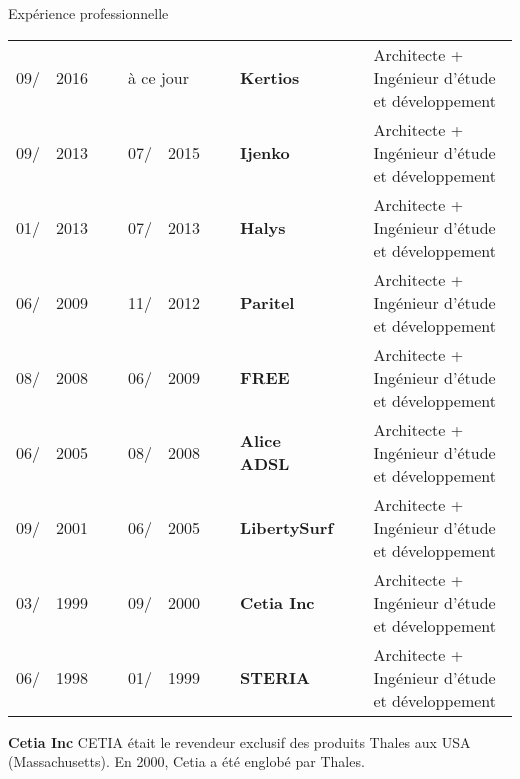 \documentclass{cv}
\newlength{\vlengthSectionTitleContent}
\newcommand{\mainSectionSeparator}[1]{%
   \vspace{10pt}\par%
   \begin{tcolorbox}[notitle,
                     nobeforeafter, %
                     boxrule=0pt,
                     top=1pt,
                     bottom=1pt,
                     halign=center,
                     valign=center,
                     width=\textwidth,
                     colback={colorMainSection}]%
      #1%
   \end{tcolorbox}%
   \par%
}%
\newenvironment{sectionComponent}{%
   \vspace{\vlengthSectionTitleContent}\par%
}{%
   \par%
}%
\newenvironment{packed_tabular}{
   \setlength{\tabcolsep}{0pt}
}{}
\newcommand{\cpname}[1]{%
  \textbf{#1}%
}
\begin{document}

   \newpage
   \mainSectionSeparator{Expérience professionnelle}

   \begin{sectionComponent}
      \begin{packed_tabular}
         \begin{tabular}{lclclclll}
            09/ & 2016 & ~ & \multicolumn{2}{l}{à ce jour} & ~ & \cpname{Kertios}     & ~ &%
                Architecte + Ingénieur d'étude et développement \\
            09/ & 2013 & ~ & 07/ & 2015                    & ~ & \cpname{Ijenko}      & ~ &%
                Architecte + Ingénieur d'étude et développement \\
            01/ & 2013 & ~ & 07/ & 2013                    & ~ & \cpname{Halys}       & ~ &%
                Architecte + Ingénieur d'étude et développement \\
            06/ & 2009 & ~ & 11/ & 2012                    & ~ & \cpname{Paritel}     & ~ &%
                Architecte + Ingénieur d'étude et développement \\
            08/ & 2008 & ~ & 06/ & 2009                    & ~ & \cpname{FREE}        & ~ &%
                Architecte + Ingénieur d'étude et développement \\
            06/ & 2005 & ~ & 08/ & 2008                    & ~ & \cpname{Alice ADSL}  & ~ &%
                Architecte + Ingénieur d'étude et développement \\
            09/ & 2001 & ~ & 06/ & 2005                    & ~ & \cpname{LibertySurf} & ~ &%
                Architecte + Ingénieur d'étude et développement \\
            03/ & 1999 & ~ & 09/ & 2000                    & ~ & \cpname{Cetia Inc}   & ~ &%
                Architecte + Ingénieur d'étude et développement \\
            06/ & 1998 & ~ & 01/ & 1999                    & ~ & \cpname{STERIA}      & ~ &%
                Architecte + Ingénieur d'étude et développement \\
         \end{tabular}%
      \end{packed_tabular}%
      \par\vspace{10pt}\par
   
      \cpname{Cetia Inc} CETIA était le revendeur exclusif des produits Thales aux USA (Massachusetts). En 2000, Cetia a été englobé par Thales.
   \end{sectionComponent}
\end{document}
